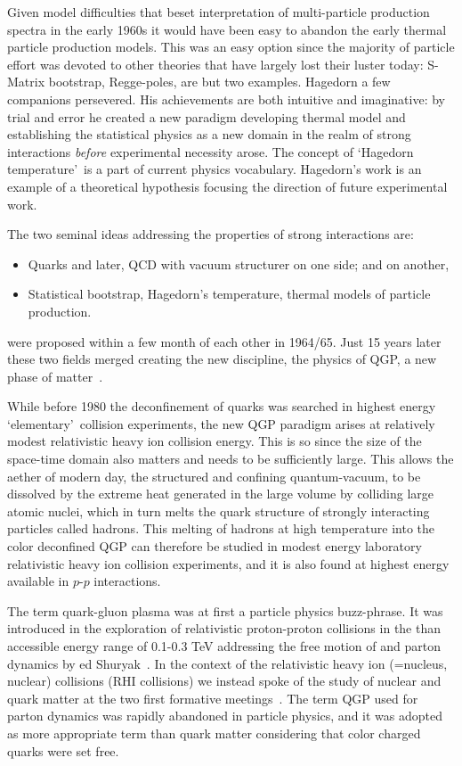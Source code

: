 Given model difficulties that beset interpretation of multi-particle production spectra in the early 1960s it would have been easy to abandon the early thermal particle production models. This was an easy option since the majority of particle effort was devoted to other theories that have largely lost their luster today: S-Matrix bootstrap, Regge-poles, are but two examples. Hagedorn a few companions persevered. His achievements are both intuitive and imaginative: by trial and error he created a new paradigm developing thermal model and establishing the statistical physics as a new domain in the realm of strong interactions {\em before} experimental necessity arose. The concept of \lq Hagedorn temperature\rq\ is a part of current physics vocabulary. Hagedorn\rq s work is an example of a theoretical hypothesis focusing the direction of future experimental work. 

The two seminal ideas addressing the properties of strong interactions are:
\begin{itemize}
\item
Quarks and later, QCD with vacuum structurer on one side; and on another, 
\item 
Statistical bootstrap, Hagedorn\rq s temperature, thermal models of particle production. 
\end{itemize}
were proposed within a few month of each other in 1964/65. Just 15 years later these two fields merged creating the new discipline, the physics of QGP, a new phase of matter~\cite{Rafelski:2015cxa}. 

While before 1980 the deconfinement of quarks was searched in highest energy \lq elementary\rq\ collision experiments, the new QGP paradigm arises at relatively modest relativistic heavy ion collision energy. This is so since the size of the space-time domain also matters and needs to be sufficiently large. This allows the aether of modern day, the structured and confining quantum-vacuum, to be dissolved by the extreme heat generated in the large volume by colliding large atomic nuclei, which in turn melts the quark structure of strongly interacting particles called hadrons. This melting of hadrons at high temperature into the color deconfined QGP can therefore be studied in modest energy laboratory relativistic heavy ion collision experiments, and it is also found at highest energy available in $p$-$p$ interactions. 

The term quark-gluon plasma was at first a particle physics buzz-phrase. It was introduced in the exploration of relativistic proton-proton collisions in the than accessible energy range of 0.1-0.3 TeV addressing the free motion of and parton dynamics by ed Shuryak~\cite{Shuryak:1978ij}. In the context of the relativistic heavy ion (=nucleus, nuclear) collisions (RHI collisions) we instead spoke of the study of nuclear and quark matter at the two first formative meetings~\cite{Satz:1980Bil,Bock:1980GSI}. The term QGP used for parton dynamics was rapidly abandoned in particle physics, and it was adopted as more appropriate term than quark matter considering that color charged quarks were set free.

